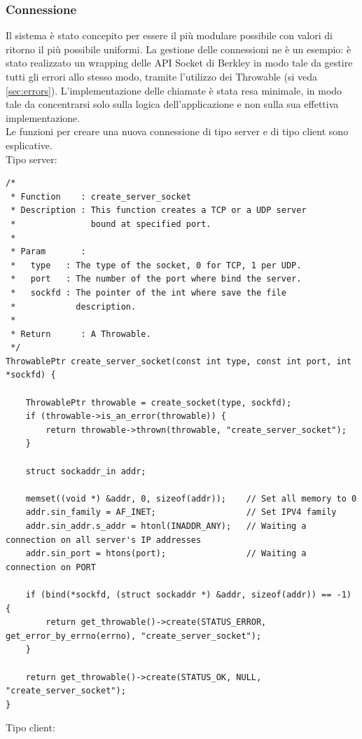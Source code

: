 \documentclass[italian]{tktltiki2}
\begin{document}
\subsubsection*{Connessione}
Il sistema è stato concepito per essere il più modulare possibile con valori di ritorno il più possibile uniformi. La gestione delle connessioni ne è un esempio: è stato realizzato un wrapping delle API Socket di Berkley in modo tale da gestire tutti gli errori allo stesso modo, tramite l'utilizzo dei Throwable (si veda \ref{sec:errors}). L'implementazione delle chiamate è stata resa minimale, in modo tale da concentrarsi solo sulla logica dell'applicazione e non sulla sua effettiva implementazione.
\\
Le funzioni per creare una nuova connessione di tipo server e di tipo client sono esplicative.
\\
Tipo server:
\begin{lstlisting}
/*
 * Function    : create_server_socket
 * Description : This function creates a TCP or a UDP server
 *               bound at specified port.
 *
 * Param       :
 *   type   : The type of the socket, 0 for TCP, 1 per UDP.
 *   port   : The number of the port where bind the server.
 *   sockfd : The pointer of the int where save the file
 *            description.
 *
 * Return      : A Throwable.
 */
ThrowablePtr create_server_socket(const int type, const int port, int *sockfd) {

    ThrowablePtr throwable = create_socket(type, sockfd);
    if (throwable->is_an_error(throwable)) {
        return throwable->thrown(throwable, "create_server_socket");
    }

    struct sockaddr_in addr;

    memset((void *) &addr, 0, sizeof(addr));    // Set all memory to 0
    addr.sin_family = AF_INET;                  // Set IPV4 family
    addr.sin_addr.s_addr = htonl(INADDR_ANY);   // Waiting a connection on all server's IP addresses
    addr.sin_port = htons(port);                // Waiting a connection on PORT

    if (bind(*sockfd, (struct sockaddr *) &addr, sizeof(addr)) == -1) {
        return get_throwable()->create(STATUS_ERROR, get_error_by_errno(errno), "create_server_socket");
    }

    return get_throwable()->create(STATUS_OK, NULL, "create_server_socket");
}
\end{lstlisting}
Tipo client:
\end{document}
